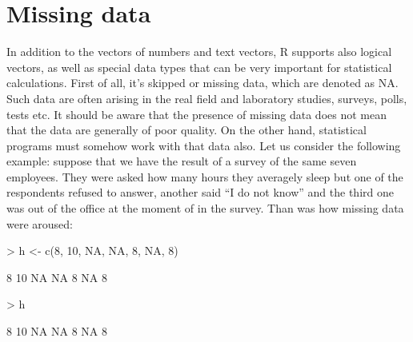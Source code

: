 \documentclass[a4paper,11pt]{scrartcl}
\begin{document}
\section{Missing data}
\label{sec:missdata}

In addition to the vectors of numbers and text vectors, R supports also logical vectors, as well as special data types that can be very important for statistical calculations. First of all, it's skipped or missing data, which are denoted as NA. Such data are often arising in the real field and laboratory studies, surveys, polls, tests etc. It should be aware that the presence of missing data does not mean that the data are generally of poor quality. On the other hand, statistical programs must somehow work with that data also. Let us consider the following example: suppose that we have the result of a survey of the same seven employees. They were asked how many hours they averagely sleep but one of the respondents refused to answer, another said “I do not know” and the third one was out of the office at the moment of in the survey. Than was how missing data were aroused:
\begin{Schunk}
\begin{Sinput}
> h <- c(8, 10, NA, NA, 8, NA, 8)
\end{Sinput}
\begin{Soutput}
[1]  8 10 NA NA  8 NA  8
\end{Soutput}
\begin{Sinput}
> h
\end{Sinput}
\begin{Soutput}
[1]  8 10 NA NA  8 NA  8
\end{Soutput}
\end{Schunk}
\end{document}
